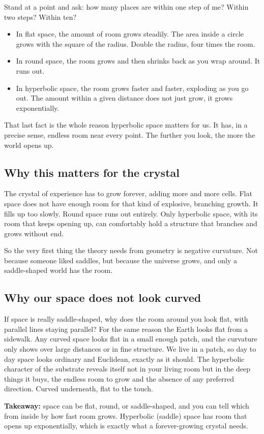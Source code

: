 Stand at a point and ask: how many places are within one step of me? Within two steps? Within ten?

\begin{itemize}
\item In flat space, the amount of room grows steadily. The area inside a circle grows with the square of the radius. Double the radius, four times the room.
\item In round space, the room grows and then shrinks back as you wrap around. It runs out.
\item In hyperbolic space, the room grows faster and faster, exploding as you go out. The amount within a given distance does not just grow, it grows exponentially.
\end{itemize}

That last fact is the whole reason hyperbolic space matters for us. It has, in a precise sense, endless room near every point. The further you look, the more the world opens up.

\subsection{Why this matters for the crystal}

The crystal of experience has to grow forever, adding more and more cells. Flat space does not have enough room for that kind of explosive, branching growth. It fills up too slowly. Round space runs out entirely. Only hyperbolic space, with its room that keeps opening up, can comfortably hold a structure that branches and grows without end.

So the very first thing the theory needs from geometry is negative curvature. Not because someone liked saddles, but because the universe grows, and only a saddle-shaped world has the room.

\subsection{Why our space does not look curved}

If space is really saddle-shaped, why does the room around you look flat, with parallel lines staying parallel? For the same reason the Earth looks flat from a sidewalk. Any curved space looks flat in a small enough patch, and the curvature only shows over large distances or in fine structure. We live in a patch, so day to day space looks ordinary and Euclidean, exactly as it should. The hyperbolic character of the substrate reveals itself not in your living room but in the deep things it buys, the endless room to grow and the absence of any preferred direction. Curved underneath, flat to the touch.

\textbf{Takeaway:} space can be flat, round, or saddle-shaped, and you can tell which from inside by how fast room grows. Hyperbolic (saddle) space has room that opens up exponentially, which is exactly what a forever-growing crystal needs.
